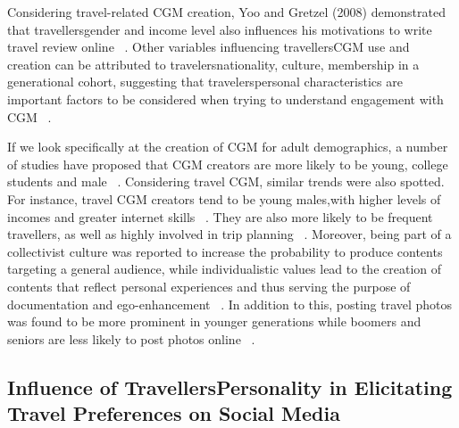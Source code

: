 Considering travel-related CGM creation, Yoo and Gretzel (2008) demonstrated that travellers\textquotesingle  gender and income level also influences his motivations to write travel review online ~\cite{yoo2008motivates}. Other variables influencing travellers\textquotesingle   CGM use and creation can be attributed to travelers\textquotesingle  nationality, culture, membership in a generational cohort, suggesting that travelers\textquotesingle  personal characteristics are important factors to be considered when trying to understand engagement with CGM ~\cite{yoo2011influence}.



If we look specifically at the creation of CGM for adult demographics, a number of studies have proposed that CGM creators are more likely to be young, college students and male ~\cite{yoo2011influence}.
Considering travel CGM, similar trends were also spotted. For instance, travel CGM creators tend to be young males,with higher levels of incomes and greater internet skills ~\cite{yoo2008understanding}. They are also more likely to be frequent travellers, as well as highly involved in trip planning ~\cite{gretzel2008use}. Moreover, being part of a collectivist culture was reported to increase the probability to produce contents targeting a general audience, while individualistic values lead to the creation of contents that reflect personal experiences and thus serving the purpose of documentation and ego-enhancement ~\cite{lee2009social}. In addition to this, posting travel photos was found to be more prominent in younger generations while boomers and seniors are less likely to post photos online ~\cite{yoo2011influence}.

    
\subsection{Influence of Travellers\textquotesingle  Personality in Elicitating Travel Preferences on Social Media}\label{3}



